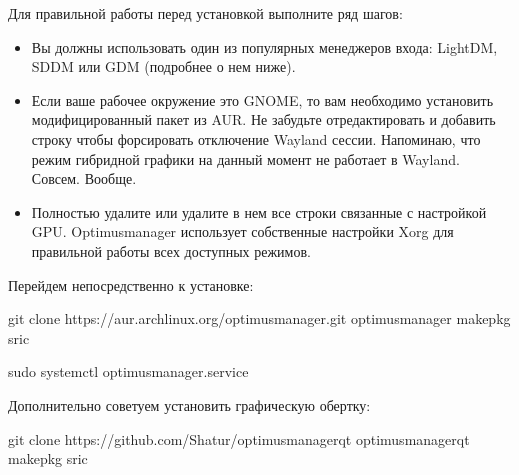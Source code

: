 \documentclass[letterpaper,10pt,russian,openany]{sphinxmanual}
\begin{document}
\sphinxAtStartPar
Для правильной работы перед установкой выполните ряд шагов:
\begin{itemize}
\item {} 
\sphinxAtStartPar
Вы должны использовать один из популярных менеджеров входа: LightDM, SDDM или GDM (подробнее о нем ниже).

\item {} 
\sphinxAtStartPar
Если ваше рабочее окружение это GNOME, то вам необходимо установить модифицированный пакет  из AUR.
Не забудьте отредактировать  и добавить строку  чтобы форсировать отключение Wayland сессии.
Напоминаю, что режим гибридной графики на данный момент не работает в Wayland. Совсем. Вообще.

\item {} 
\sphinxAtStartPar
Полностью удалите  или удалите в нем все строки связанные с настройкой GPU.
Optimus\sphinxhyphen{}manager использует собственные настройки Xorg для правильной работы всех доступных режимов.

\end{itemize}

\sphinxAtStartPar
Перейдем непосредственно к установке:

\begin{sphinxVerbatim}[commandchars=\\\{\}]
git clone https://aur.archlinux.org/optimus\PYGZhy{}manager.git 
 optimus\PYGZhy{}manager                                      
makepkg \PYGZhy{}sric                                           

sudo systemctl  optimus\PYGZhy{}manager.service 
\end{sphinxVerbatim}

\sphinxAtStartPar
Дополнительно советуем установить графическую обертку:

\begin{sphinxVerbatim}[commandchars=\\\{\}]
git clone https://github.com/Shatur/optimus\PYGZhy{}manager\PYGZhy{}qt  
 optimus\PYGZhy{}manager\PYGZhy{}qt                                   
makepkg \PYGZhy{}sric                                           
\end{sphinxVerbatim}
\end{document}
